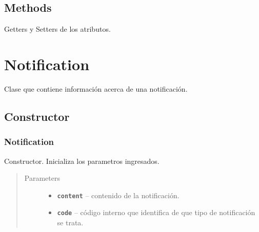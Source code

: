 \documentclass[letterpaper,10pt,english]{sphinxmanual}
\begin{document}
\subsection{Methods}
\label{Model/Job:methods}
Getters y Setters de los atributos.


\section{Notification}
\label{Model/Notification:notification}\label{Model/Notification::doc}

\begin{fulllineitems}
\label{Model/Notification:com.fiuba.tallerii.jobify.Notification}
Clase que contiene información acerca de una notificación.

\end{fulllineitems}



\subsection{Constructor}
\label{Model/Notification:constructor}

\subsubsection{Notification}
\label{Model/Notification:id1}

\begin{fulllineitems}
\label{Model/Notification:com.fiuba.tallerii.jobify.Notification.Notification(String, int)}
Constructor. Inicializa los parametros ingresados.
\begin{quote}\begin{description}
\item[{Parameters}] \leavevmode\begin{itemize}
\item {} 
\textbf{\texttt{content}} -- contenido de la notificación.

\item {} 
\textbf{\texttt{code}} -- código interno que identifica de que tipo de notificación se trata.

\end{itemize}

\end{description}\end{quote}

\end{fulllineitems}
\end{document}
